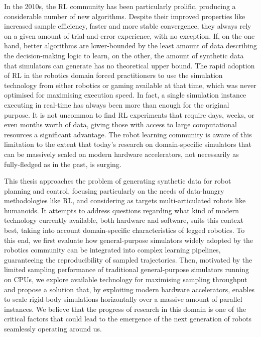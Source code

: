 In the 2010s, the \ac{RL} community has been particularly prolific, producing a considerable number of new algorithms.
Despite their improved properties like increased sample efficiency, faster and more stable convergence, \etc they always rely on a given amount of trial-and-error experience, with no exception.
If, on the one hand, better algorithms are lower-bounded by the least amount of data describing the decision-making logic to learn, on the other, the amount of synthetic data that simulators can generate has no theoretical upper bound.
The rapid adoption of \ac{RL} in the robotics domain forced practitioners to use the simulation technology from either robotics or gaming available at that time, which was never optimised for maximising execution speed.
In fact, a single simulation instance executing in real-time has always been more than enough for the original purpose.
It is not uncommon to find \ac{RL} experiments that require days, weeks, or even months worth of data, giving those with access to large computational resources a significant advantage.
The robot learning community is aware of this limitation to the extent that today's research on domain-specific simulators that can be massively scaled on modern hardware accelerators, not necessarily as fully-fledged as in the past, is surging.

\vspace{3mm}
This thesis approaches the problem of generating synthetic data for robot planning and control, focusing particularly on the needs of data-hungry methodologies like \ac{RL}, and considering as targets multi-articulated robots like humanoids.
It attempts to address questions regarding what kind of modern technology currently available, both hardware and software, suits this context best, taking into account domain-specific characteristics of legged robotics.
To this end, we first evaluate how general-purpose simulators widely adopted by the robotics community can be integrated into complex learning pipelines, guaranteeing the reproducibility of sampled trajectories.
Then, motivated by the limited sampling performance of traditional general-purpose simulators running on \acp{CPU}, we explore available technology for maximising sampling throughput and propose a solution that, by exploiting modern hardware accelerators, enables to scale rigid-body simulations horizontally over a massive amount of parallel instances.
We believe that the progress of research in this domain is one of the critical factors that could lead to the emergence of the next generation of robots seamlessly operating around us.

